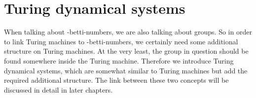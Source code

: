 \section{Turing dynamical systems} \label{tds}

When talking about \ltwo-betti-numbers, we are also talking about groups.
So in order to link Turing machines to \ltwo-betti-numbers, we certainly need some additional structure on Turing machines.
At the very least, the group in question should be found somewhere inside the Turing machine.
Therefore we introduce Turing dynamical systems, which are somewhat similar to Turing machines but add the required additional structure.
The link between these two concepts will be discussed in detail in later chapters.








